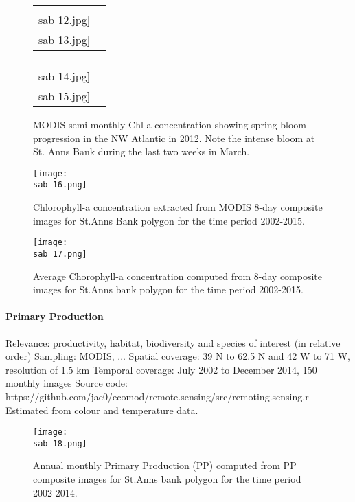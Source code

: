 \documentclass[letterpaper,portrait,11pt]{scrartcl}
\numberwithin{equation}{section}		%
\numberwithin{figure}{section}			%
\numberwithin{table}{section}				%
\newcommand{\ecomod}{\string~/ecomod_data/}   %
\newcommand{\sab}{\ecomod/mpa/sab/}   %
\begin{document}
\begin{figure}[ht]
  \centering
  \begin{tabular}{cc}
    \texttt{[image: \\sab 12.jpg]}
    \texttt{[image: \\sab 13.jpg]}
  \end{tabular}
  \begin{tabular}{cc}
    \texttt{[image: \\sab 14.jpg]}
    \texttt{[image: \\sab 15.jpg]}
  \end{tabular}
  \caption{MODIS semi-monthly Chl-a concentration showing spring bloom progression in the NW Atlantic in 2012. Note the intense bloom at St. Anns Bank during the last two weeks in March.}
  \label{fig2.3.3-1}
\end{figure}


\begin{figure}[h]
  \centering
  \texttt{[image: \\sab 16.png]}
  \caption{Chlorophyll-a concentration extracted from MODIS 8-day composite images for St.Anns Bank polygon for the time period 2002-2015.}
  \label{Figure 2.3.3-2: }
\end{figure}


\begin{figure}[h]
  \centering
  \texttt{[image: \\sab 17.png]}
  \caption {Average Chorophyll-a concentration computed from 8-day composite images for St.Anns bank polygon for the time period 2002-2015. }
  \label{Figure 2.3.3-3: }
\end{figure}


\paragraph{Primary Production}

Relevance:  productivity, habitat, biodiversity and species of interest (in relative order)
Sampling:  MODIS, ...
Spatial coverage: 39 N to 62.5 N and 42 W to 71 W, resolution of 1.5 km
Temporal coverage: July 2002 to December 2014, 150 monthly  images
Source code: https://github.com/jae0/ecomod/remote.sensing/src/remoting.sensing.r
Estimated from colour and temperature data.

\begin{figure}[h]
  \centering
  \texttt{[image: \\sab 18.png]}
  \caption{Annual monthly Primary Production (PP) computed from PP composite images for St.Anns bank polygon for the time period 2002-2014.}
\label{Figure x: }
\end{figure}
\end{document}
